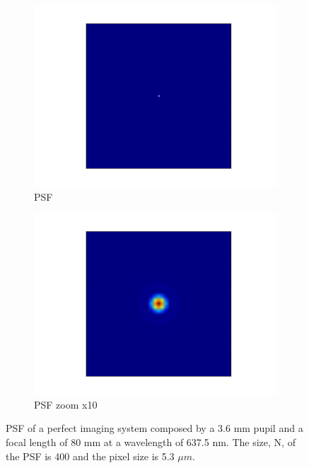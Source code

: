 \begin{figure}
\centering
    \begin{subfigure}{0.4\textwidth}
        \includegraphics[width=\textwidth]{Figures/PSF}
        \caption{PSF}
        \label{subfig:PSF}
    \end{subfigure}
    \quad
    \begin{subfigure}{0.4\textwidth}
        \includegraphics[width=\textwidth]{Figures/PSFzoom}
        \caption{PSF zoom x10}
        \label{subfig:PSFzoom}
    \end{subfigure}
    \decoRule
    \caption{PSF of a perfect imaging system composed by a 3.6 mm pupil and a focal length of 80 mm at a wavelength of 637.5 nm. The size, N, of the PSF is 400 and the pixel size is 5.3 $\mu m$.}
    \label{fig:PSF}
\end{figure} 

